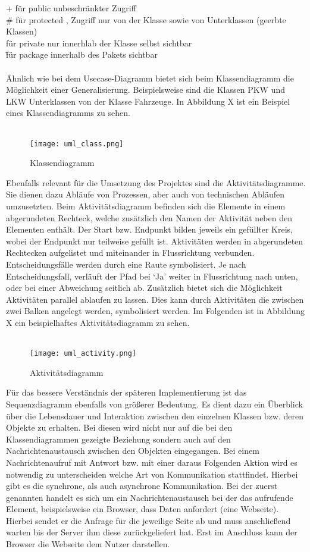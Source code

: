      + für public   unbeschränkter Zugriff\\
     \# für protected  , Zugriff nur von der Klasse sowie von Unterklassen (geerbte Klassen)\\
     \- für private  nur innerhlab der Klasse selbst sichtbar\\
     \~ für package  innerhalb des Pakets sichtbar\\
\\
Ähnlich wie bei dem Usecase-Diagramm bietet sich beim Klassendiagramm die Möglichkeit einer Generalisierung. Beispielsweise sind die Klassen PKW und LKW Unterklassen von der Klasse Fahrzeuge. In Abbildung X ist ein Beispiel eines Klassendiagramms zu sehen.\\
\\
\begin{figure}[H]
\centering
\texttt{[image: uml\_class.png]}
\caption{Klassendiagramm}
\label{fig:show_s1_s2_p1_n1}
\end{figure}
Ebenfalls relevant für die Umsetzung des Projektes sind die Aktivitätsdiagramme. Sie dienen dazu Abläufe von Prozessen, aber auch von technischen Abläufen umzusetzten.
Beim Aktivitätsdiagramm befinden sich die Elemente in einem abgerundeten Rechteck, welche zusätzlich den Namen der Aktivität neben den Elementen enthält. Der Start bzw. Endpunkt bilden jeweils ein gefüllter Kreis, wobei der Endpunkt nur teilweise gefüllt ist. Aktivitäten werden in abgerundeten Rechtecken aufgelistet und miteinander in Flussrichtung verbunden. Entscheidungsfälle werden durch eine Raute symbolisiert. Je nach Entscheidungsfall, verläuft der Pfad bei ‘Ja’ weiter in Flussrichtung nach unten, oder bei einer Abweichung seitlich ab. Zusätzlich bietet sich die Möglichkeit Aktivitäten parallel ablaufen zu lassen. Dies kann durch Aktivitäten die zwischen zwei Balken angelegt werden, symbolisiert werden. Im Folgenden ist in Abbildung X ein beispielhaftes Aktivitätsdiagramm zu sehen.\\
\\
\begin{figure}[H]
\centering
\texttt{[image: uml\_activity.png]}
\caption{Aktivitätsdiagramm}
\label{fig:show_s1_s2_p1_n1}
\end{figure}
Für das bessere Verständnis der späteren Implementierung ist das Sequenzdiagramm ebenfalls von größerer Bedeutung. Es dient dazu ein Überblick über die Lebensdauer und Interaktion zwischen den einzelnen Klassen bzw. deren Objekte zu erhalten. Bei diesen wird nicht nur auf die bei den Klassendiagrammen gezeigte Beziehung sondern auch auf den Nachrichtenaustausch zwischen den Objekten eingegangen. Bei einem Nachrichtenaufruf mit Antwort bzw. mit einer daraus Folgenden Aktion wird es notwendig zu unterscheiden welche Art von Kommunikation stattfindet. Hierbei gibt es die synchrone, als auch asynchrone Kommunikation. Bei der zuerst genannten handelt es sich um ein Nachrichtenaustausch bei der das aufrufende Element, beispielsweise ein Browser, dass Daten anfordert (eine Webseite). Hierbei sendet er die Anfrage für die jeweilige Seite ab und muss anschließend warten bis der Server ihm diese zurückgeliefert hat. Erst im Anschluss kann der Browser die Webseite dem Nutzer darstellen.
